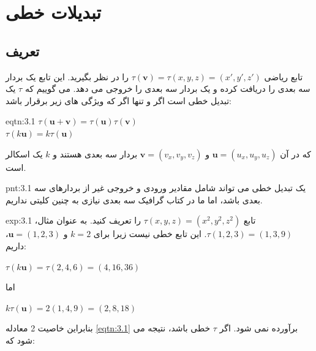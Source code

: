 \setcounter{figure}{0}
\renewcommand{\thefigure}{\arabic{figure}.\arabic{chapter}}


\section{\textbf{تبدیلات خطی}}
\label{sec:3.1}
\subsection{\textbf{تعریف}}
{
    \Large
    \begin{spacing}{1.5}
        تابع ریاضی $\tau(\textbf{v})=\tau(x,y,z)=(x\prime,y\prime,z\prime)$ را در نظر بگیرید.
        این تابع یک بردار سه بعدی را دریافت کرده و یک بردار سه بعدی را خروجی می دهد.
        می گوییم که $\tau$ یک تبدیل خطی است اگر و تنها اگر که ویژگی های زیر برقرار باشد:

        \begin{eqtn}{eqtn:3.1}
            \centering
            $\tau(\textbf{u}+\textbf{v})=\tau(\textbf{u})\tau(\textbf{v})$\\
            $\tau(k\textbf{u})=k\tau(\textbf{u})$
        \end{eqtn}

        که در آن $\textbf{u}=(u_x,u_y,u_z)$ و $\textbf{v}=(v_x,v_y,v_z)$ بردار سه بعدی هستند و $k$ یک اسکالر است.

        \begin{point}{pnt:3.1}
            یک تبدیل خطی می تواند شامل مقادیر ورودی و خروجی غیر از بردارهای سه بعدی باشد،
            اما ما در کتاب گرافیک سه بعدی نیازی به چنین کلیتی نداریم.
        \end{point}

        \begin{example}{exp:3.1}
            \Large
            تابع $\tau(x,y,z)=(x^2,y^2,z^2)$ را تعریف کنید.
            به عنوان مثال، $\tau(1,2,3)=(1,3,9)$. این تابع خطی نیست زیرا برای $k=2$ و $\textbf{u}=(1,2,3)$، داریم:

            \begin{center}
                $\tau(k\textbf{u})=\tau(2,4,6)=(4,16,36)$
            \end{center}

            اما

            \begin{center}
                $k\tau(\textbf{u})=2(1,4,9)=(2,8,18)$
            \end{center}

            بنابراین خاصیت 2 معادله \ref{eqtn:3.1} برآورده نمی شود.
            اگر $\tau$ خطی باشد، نتیجه می شود که:


\end{example}
\end{spacing}}
